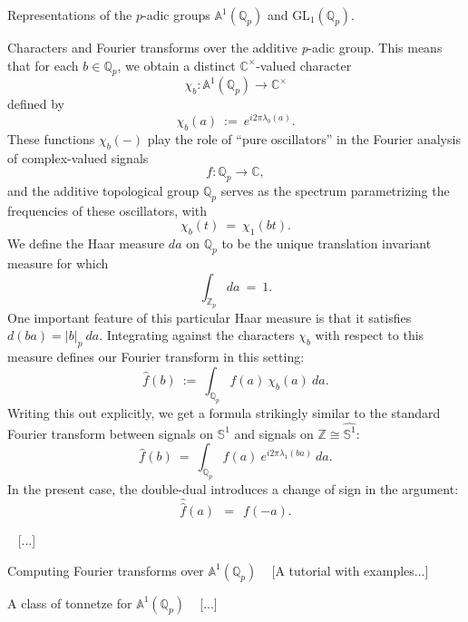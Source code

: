\documentclass[letterpaper,11pt, reqno]{amsart}
\newtheorem{monodromy theorem}{Monodromy Theorem}[subsection]
\newtheorem{wild conjecture}[theorem]{Wild Conjecture}
\newtheorem{research objectives}{Research objectives}[subsection]
\newtheorem{research question}[theorem]{Research questions}
\newtheorem{aside question}[theorem]{Aside question}
\newtheorem{audio example}[theorem]{\loudspeaker[3] Example}
\newtheorem{blank remark}[theorem]{}
\newtheorem{terminology and comment}[theorem]{Terminology and comment}
\newtheorem{purity hypothesis}[theorem]{Purity hypothesis}
\newtheorem{corollary of the purity hypothesis}[theorem]{Corollary of the purity hypothesis}
\newcommand{\CC} {{\mathbb C}}
\newcommand{\QQ} {{\mathbb Q}}
\newcommand{\ZZ} {{\mathbb Z}}
\newcommand{\lra}{{\longrightarrow}}
\numberwithin{equation}{theorem}
\begin{document}
\begin{section}{Representations of the $p$-adic groups $\mathbb{A}^{\!1}(\mathbb{Q}_{p})$ and $\text{GL}_{1}(\mathbb{Q}_{p})$.}
\begin{subsection}{Characters and Fourier transforms over the additive {\em p}-adic group.}
	This means that for each $b\in\QQ_{p}$, we obtain a distinct $\CC^\times$-valued character
	$$
	\chi_{b}:\mathbb{A}^{\!1}(\QQ_{p})\lra\CC^\times
	$$
defined by
	$$
	\chi_{b}(a)
	\ :=\ 
	e^{i2\pi\lambda_{b}(a)}.
	$$
These functions $\chi_{b}(-)$ play the role of ``pure oscillators'' in the Fourier analysis of complex-valued signals
	$$
	f:\QQ_{p}\lra\CC,
	$$
and the additive topological group $\QQ_{p}$ serves as the spectrum parametrizing the frequencies of these oscillators, with
	$$
	\chi_{b}(t)
	\ =\ 
	\chi_{1}(bt).
	$$
We define the Haar measure $da$ on $\QQ_{p}$ to be the unique translation invariant measure for which
	$$
	\int_{\ZZ_{p}}\!\!\!\!da\ =\ 1.
	$$
One important feature of this particular Haar measure is that it satisfies $d(ba)=|b|_{p}\ da$. Integrating against the characters $\chi_{b}$ with respect to this measure defines our Fourier transform in this setting:
	$$
	\widehat{f}(b)
	\ :=\ 
	\int_{\QQ_{p}}\!\!\!f(a)\ \chi_{b}(a)\ da.
	$$
Writing this out explicitly, we get a formula strikingly similar to the standard Fourier transform between signals on $\mathbb{S}^{1}$ and signals on $\ZZ\cong\widehat{\mathbb{S}^{1}}$:
	$$
	\widehat{f}(b)
	\ =\ 
	\int_{\QQ_{p}}\!\!\!f(a)\ e^{i2\pi\lambda_{1}(ba)}\ da.
	$$
In the present case, the double-dual introduces a change of sign in the argument:
	$$
	\widehat{\text{$\!\!\widehat{f}$}}
	(a)
	\ \ =\ \ 
	f(-a).
	$$

\ 
{\color{red} [...]}

\end{subsection}

\begin{subsection}{Computing Fourier transforms over $\mathbb{A}^{\!1}(\QQ_{p})$}
\ 
{\color{red} [A tutorial with examples...]}
\end{subsection}

\begin{subsection}{A class of tonnetze for $\mathbb{A}^{\!1}(\QQ_{p})$}
\ 
{\color{red} [...]}
\end{subsection}


\end{section}
\end{document}
